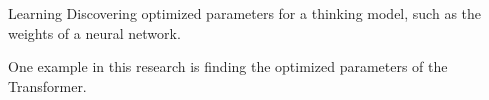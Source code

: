 \begin{frame}[allowframebreaks]{Learning}
    Discovering optimized parameters for a thinking model, such as the weights of a neural network.
    
    One example in this research is finding the optimized parameters of the Transformer.
\end{frame}